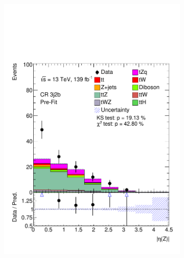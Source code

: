 \begin{figure}[h!]
\begin{subfigure}[b]{0.32\linewidth}
    \includegraphics[width=\linewidth]{ubonn-thesis/Chapters/Chapters_05/Figure/CR_ttZ/CR_3j2b_Z_eta.pdf} 
  \end{subfigure} 
  \begin{subfigure}[b]{0.32\linewidth}
    \centering

\end{subfigure}
\end{figure}

